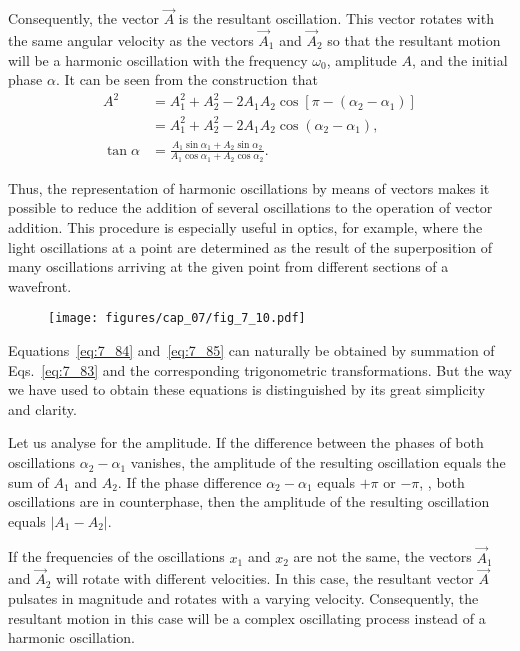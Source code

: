 \noindent
Consequently, the vector $\vec{A}$ is the resultant oscillation. This vector rotates with the same angular velocity as the vectors $\vec{A}_1$ and $\vec{A}_2$ so that the resultant motion will be a harmonic oscillation with the frequency $\omega_0$, amplitude $A$, and the initial phase $\alpha$. It can be seen from the construction that
\begin{align}
	A^2 &= A_1^2 + A_2^2 - 2A_1A_2\cos[\pi-(\alpha_2-\alpha_1)] \nonumber\\
	&= A_1^2 + A_2^2 - 2A_1A_2\cos(\alpha_2-\alpha_1), \label{eq:7_84}\\
	\tan\alpha &= \frac{A_1\sin\alpha_1 + A_2\sin\alpha_2}{A_1\cos\alpha_1 + A_2\cos\alpha_2}.\label{eq:7_85}
\end{align}

Thus, the representation of harmonic oscillations by means of vectors makes it possible to reduce the addition of several oscillations to the operation of vector addition. This procedure is especially useful in optics, for example, where the light oscillations at a point are determined as the result of the superposition of many oscillations arriving at the given point from different sections of a wavefront. 

\begin{figure}[t]
	\begin{center}
		\texttt{[image: figures/cap\_07/fig\_7\_10.pdf]}
		\caption[]{}
		\label{fig:7_10}
	\end{center}
	\vspace{-0.8cm}
\end{figure}

Equations~\eqref{eq:7_84} and~\eqref{eq:7_85} can naturally be obtained by summation of Eqs.~\eqref{eq:7_83} and the corresponding trigonometric transformations. But the way we have used to obtain these equations is distinguished by its great simplicity and clarity.

Let us analyse  for the amplitude. If the difference between the phases of both oscillations $\alpha_2-\alpha_1$ vanishes, the amplitude of the resulting oscillation equals the sum of $A_1$ and $A_ 2$. If the phase difference $\alpha_2-\alpha_1$ equals $+\pi$ or $-\pi$, \ie, both oscillations are in counterphase, then the amplitude of the resulting oscillation equals $|A_1-A_2|$.

If the frequencies of the oscillations $x_1$ and $x_2$ are not the same, the vectors $\vec{A}_1$ and $\vec{A}_2$ will rotate with different velocities. In this case, the resultant vector $\vec{A}$ pulsates in magnitude and rotates with a varying velocity. Consequently, the resultant motion in this case will be a complex oscillating process instead of a harmonic oscillation.


